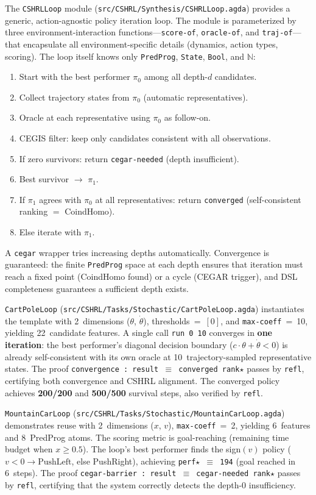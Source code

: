 \documentclass[9pt,a4paper]{article}
\newcommand{\fpath}[1]{\nolinkurl{#1}}
\theoremstyle{plain}
\theoremstyle{definition}
\theoremstyle{remark}
\begin{document}
The \texttt{CSHRLLoop} module (\fpath{src/CSHRL/Synthesis/CSHRLLoop.agda}) provides a generic, action-agnostic policy iteration loop.  The module is parameterized by three environment-interaction functions---\texttt{score-of}, \texttt{oracle-of}, and \texttt{traj-of}---that encapsulate all environment-specific details (dynamics, action types, scoring).  The loop itself knows only \texttt{PredProg}, \texttt{State}, \texttt{Bool}, and $\mathbb{N}$:
\begin{enumerate}
\item Start with the best performer $\pi_0$ among all depth-$d$ candidates.
\item Collect trajectory states from $\pi_0$ (automatic representatives).
\item Oracle at each representative using $\pi_0$ as follow-on.
\item CEGIS filter: keep only candidates consistent with all observations.
\item If zero survivors: return \texttt{cegar-needed} (depth insufficient).
\item Best survivor $\to$ $\pi_1$.
\item If $\pi_1$ agrees with $\pi_0$ at all representatives: return \texttt{converged} (self-consistent ranking $=$ CoindHomo).
\item Else iterate with $\pi_1$.
\end{enumerate}
A \texttt{cegar} wrapper tries increasing depths automatically.  Convergence is guaranteed: the finite \texttt{PredProg} space at each depth ensures that iteration must reach a fixed point (CoindHomo found) or a cycle (CEGAR trigger), and DSL completeness guarantees a sufficient depth exists.

\texttt{CartPoleLoop} (\fpath{src/CSHRL/Tasks/Stochastic/CartPoleLoop.agda}) instantiates the template with 2~dimensions ($\theta$, $\dot\theta$), thresholds~=~$[0]$, and \texttt{max-coeff}~=~10, yielding 22~candidate features.  A single call \texttt{run~0~10} converges in \textbf{one iteration}: the best performer's diagonal decision boundary ($c \cdot \theta + \dot\theta < 0$) is already self-consistent with its own oracle at 10~trajectory-sampled representative states.  The proof \texttt{convergence~:~result~$\equiv$~converged~rank$\star$} passes by \texttt{refl}, certifying both convergence and CSHRL alignment.  The converged policy achieves \textbf{200/200} and \textbf{500/500} survival steps, also verified by \texttt{refl}.

\texttt{MountainCarLoop} (\fpath{src/CSHRL/Tasks/Stochastic/MountainCarLoop.agda}) demonstrates reuse with 2~dimensions ($x$, $v$), \texttt{max-coeff}~=~2, yielding 6~features and 8~PredProg atoms.  The scoring metric is goal-reaching (remaining time budget when $x \ge 0.5$).  The loop's best performer finds the sign$(v)$ policy ($v < 0 \to \text{PushLeft}$, else PushRight), achieving \texttt{perf$\star$~$\equiv$~194} (goal reached in 6~steps).  The proof \texttt{cegar-barrier~:~result~$\equiv$~cegar-needed~rank$\star$} passes by \texttt{refl}, certifying that the system correctly detects the depth-0 insufficiency.
\end{document}
